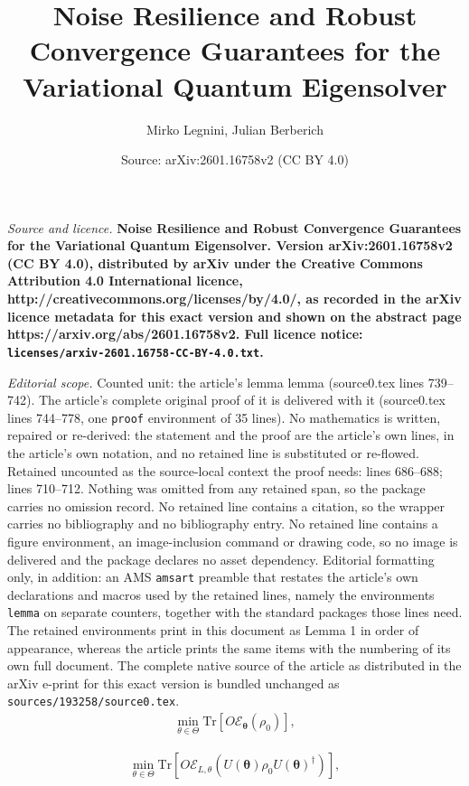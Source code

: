 \documentclass[10pt,a4paper]{amsart}
\title{\LARGE \bf Noise Resilience and Robust Convergence Guarantees for the Variational Quantum Eigensolver}
\author{Mirko Legnini, Julian Berberich}
\date{Source: arXiv:2601.16758v2 (CC BY 4.0)}
\newcommand{\Tr}{\mathrm{Tr}}
\begin{document}
\maketitle

\noindent\emph{Source and licence.} \LARGE \bf Noise Resilience and Robust Convergence Guarantees for the Variational Quantum Eigensolver. Version arXiv:2601.16758v2 (CC BY 4.0), distributed by arXiv under the Creative Commons Attribution 4.0 International licence, http://creativecommons.org/licenses/by/4.0/, as recorded in the arXiv licence metadata for this exact version and shown on the abstract page https://arxiv.org/abs/2601.16758v2. Full licence notice: \texttt{licenses/arxiv-2601.16758-CC-BY-4.0.txt}.\par\smallskip

\noindent\textit{Editorial scope.} Counted unit: the article's lemma lemma (source0.tex lines 739--742). The article's complete original proof of it is delivered with it (source0.tex lines 744--778, one \texttt{proof} environment of 35 lines). No mathematics is written, repaired or re-derived: the statement and the proof are the article's own lines, in the article's own notation, and no retained line is substituted or re-flowed.  Retained uncounted as the source-local context the proof needs: lines 686--688; lines 710--712.  Nothing was omitted from any retained span, so the package carries no omission record.  No retained line contains a citation, so the wrapper carries no bibliography and no bibliography entry.  No retained line contains a figure environment, an image-inclusion command or drawing code, so no image is delivered and the package declares no asset dependency.  Editorial formatting only, in addition: an AMS \texttt{amsart} preamble that restates the article's own declarations and macros used by the retained lines, namely the environments \texttt{lemma} on separate counters, together with the standard packages those lines need.  The retained environments print in this document as Lemma 1 in order of appearance, whereas the article prints the same items with the numbering of its own full document.  The complete native source of the article as distributed in the arXiv e-print for this exact version is bundled unchanged as \texttt{sources/193258/source0.tex}.
\begin{align}
    \min_{\theta \in \Theta} \Tr[O \mathcal{E}_\mathbf{\theta}(\rho_0)], \label{perturbedproblem}
\end{align} 

\begin{align}
   \min_{\theta \in \Theta} \Tr[O \mathcal{E}_{L,\theta}(U(\mathbf{\theta}) \rho_0 U(\mathbf{\theta})^\dagger)], \label{perturbedlast}
\end{align}
\end{document}
